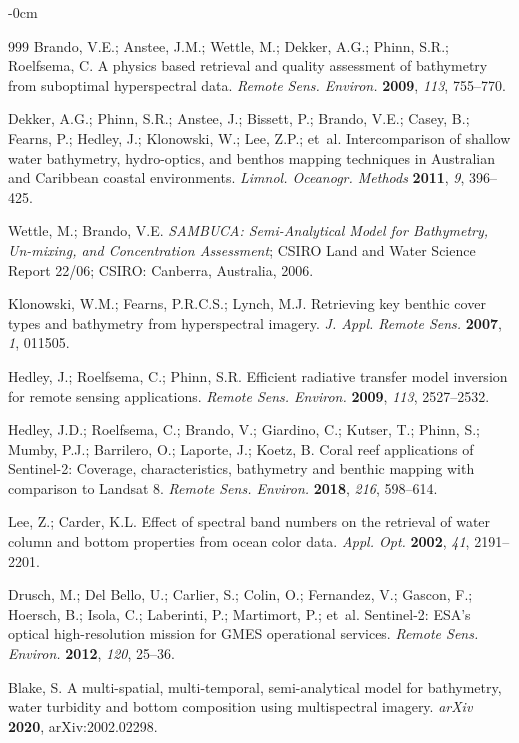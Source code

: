 \documentclass[remotesensing,article,submit,pdftex]{Definitions/mdpi}
\begin{document}
\begin{adjustwidth}{-\extralength}{0cm}
\begin{thebibliography}{999}
Brando, V.E.; Anstee, J.M.; Wettle, M.; Dekker, A.G.; Phinn, S.R.; Roelfsema, C. A physics based retrieval and quality assessment of bathymetry from suboptimal hyperspectral data. {\em Remote Sens. Environ.} {\bf 2009}, {\em 113}, 755--770.

Dekker, A.G.; Phinn, S.R.; Anstee, J.; Bissett, P.; Brando, V.E.; Casey, B.; Fearns, P.; Hedley, J.; Klonowski, W.; Lee, Z.P.; et~al. Intercomparison of shallow water bathymetry, hydro-optics, and benthos mapping techniques in Australian and Caribbean coastal environments. {\em Limnol. Oceanogr. Methods} {\bf 2011}, {\em 9}, 396--425.

Wettle, M.; Brando, V.E. {\em SAMBUCA: Semi-Analytical Model for Bathymetry, Un-mixing, and Concentration Assessment}; CSIRO Land and Water Science Report 22/06; CSIRO: Canberra, Australia, 2006.

Klonowski, W.M.; Fearns, P.R.C.S.; Lynch, M.J. Retrieving key benthic cover types and bathymetry from hyperspectral imagery. {\em J. Appl. Remote Sens.} {\bf 2007}, {\em 1}, 011505.

Hedley, J.; Roelfsema, C.; Phinn, S.R. Efficient radiative transfer model inversion for remote sensing applications. {\em Remote Sens. Environ.} {\bf 2009}, {\em 113}, 2527--2532.

Hedley, J.D.; Roelfsema, C.; Brando, V.; Giardino, C.; Kutser, T.; Phinn, S.; Mumby, P.J.; Barrilero, O.; Laporte, J.; Koetz, B. Coral reef applications of Sentinel-2: Coverage, characteristics, bathymetry and benthic mapping with comparison to Landsat 8. {\em Remote Sens. Environ.} {\bf 2018}, {\em 216}, 598--614.

Lee, Z.; Carder, K.L. Effect of spectral band numbers on the retrieval of water column and bottom properties from ocean color data. {\em Appl. Opt.} {\bf 2002}, {\em 41}, 2191--2201.

Drusch, M.; Del Bello, U.; Carlier, S.; Colin, O.; Fernandez, V.; Gascon, F.; Hoersch, B.; Isola, C.; Laberinti, P.; Martimort, P.; et~al. Sentinel-2: ESA's optical high-resolution mission for GMES operational services. {\em Remote Sens. Environ.} {\bf 2012}, {\em 120}, 25--36.

Blake, S. A multi-spatial, multi-temporal, semi-analytical model for bathymetry, water turbidity and bottom composition using multispectral imagery. {\em arXiv} {\bf 2020}, arXiv:2002.02298.


\end{thebibliography}
\end{adjustwidth}
\end{document}
